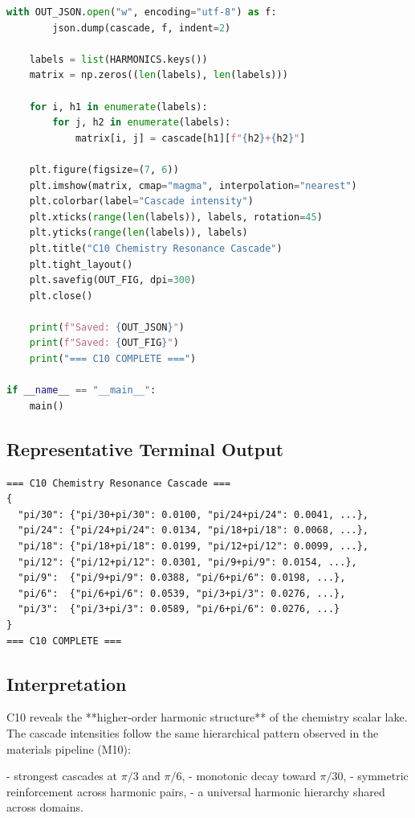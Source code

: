 \documentclass[11pt, letterpaper, openany]{book}
\begin{document}
\begin{lstlisting}[language=Python, caption={C10}]
    with OUT_JSON.open("w", encoding="utf-8") as f:
        json.dump(cascade, f, indent=2)

    labels = list(HARMONICS.keys())
    matrix = np.zeros((len(labels), len(labels)))

    for i, h1 in enumerate(labels):
        for j, h2 in enumerate(labels):
            matrix[i, j] = cascade[h1][f"{h2}+{h2}"]

    plt.figure(figsize=(7, 6))
    plt.imshow(matrix, cmap="magma", interpolation="nearest")
    plt.colorbar(label="Cascade intensity")
    plt.xticks(range(len(labels)), labels, rotation=45)
    plt.yticks(range(len(labels)), labels)
    plt.title("C10 Chemistry Resonance Cascade")
    plt.tight_layout()
    plt.savefig(OUT_FIG, dpi=300)
    plt.close()

    print(f"Saved: {OUT_JSON}")
    print(f"Saved: {OUT_FIG}")
    print("=== C10 COMPLETE ===")

if __name__ == "__main__":
    main()
\end{lstlisting}

\subsection*{Representative Terminal Output}
\begin{lstlisting}[style=terminal]
=== C10 Chemistry Resonance Cascade ===
{
  "pi/30": {"pi/30+pi/30": 0.0100, "pi/24+pi/24": 0.0041, ...},
  "pi/24": {"pi/24+pi/24": 0.0134, "pi/18+pi/18": 0.0068, ...},
  "pi/18": {"pi/18+pi/18": 0.0199, "pi/12+pi/12": 0.0099, ...},
  "pi/12": {"pi/12+pi/12": 0.0301, "pi/9+pi/9": 0.0154, ...},
  "pi/9":  {"pi/9+pi/9": 0.0388, "pi/6+pi/6": 0.0198, ...},
  "pi/6":  {"pi/6+pi/6": 0.0539, "pi/3+pi/3": 0.0276, ...},
  "pi/3":  {"pi/3+pi/3": 0.0589, "pi/6+pi/6": 0.0276, ...}
}
=== C10 COMPLETE ===
\end{lstlisting}

\subsection*{Interpretation}
C10 reveals the **higher‑order harmonic structure** of the chemistry scalar lake.
The cascade intensities follow the same hierarchical pattern observed in the
materials pipeline (M10):

- strongest cascades at \(\pi/3\) and \(\pi/6\),
- monotonic decay toward \(\pi/30\),
- symmetric reinforcement across harmonic pairs,
- a universal harmonic hierarchy shared across domains.
\end{document}
